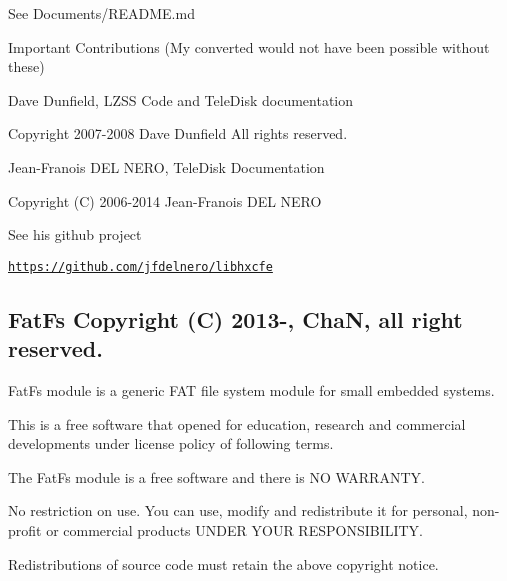\begin{DoxyItemize}
\item See Documents/\+R\+E\+A\+D\+M\+E.\+md
\begin{DoxyItemize}
\item Important Contributions (My converted would not have been possible without these)
\begin{DoxyItemize}
\item Dave Dunfield, L\+Z\+SS Code and Tele\+Disk documentation
\begin{DoxyItemize}
\item Copyright 2007-\/2008 Dave Dunfield All rights reserved.
\end{DoxyItemize}
\item Jean-\/\+Franois D\+EL N\+E\+RO, Tele\+Disk Documentation
\begin{DoxyItemize}
\item Copyright (C) 2006-\/2014 Jean-\/\+Franois D\+EL N\+E\+RO
\item See his github project
\begin{DoxyItemize}
\item \href{https://github.com/jfdelnero/libhxcfe}{\tt https\+://github.\+com/jfdelnero/libhxcfe} 


\end{DoxyItemize}
\end{DoxyItemize}
\end{DoxyItemize}
\end{DoxyItemize}
\end{DoxyItemize}

\subsection*{Fat\+Fs Copyright (C) 2013-\/, ChaN, all right reserved.}

Fat\+Fs module is a generic F\+AT file system module for small embedded systems.

This is a free software that opened for education, research and commercial developments under license policy of following terms.


\begin{DoxyItemize}
\item The Fat\+Fs module is a free software and there is NO W\+A\+R\+R\+A\+N\+TY.
\item No restriction on use. You can use, modify and redistribute it for personal, non-\/profit or commercial products U\+N\+D\+ER Y\+O\+UR R\+E\+S\+P\+O\+N\+S\+I\+B\+I\+L\+I\+TY.
\item Redistributions of source code must retain the above copyright notice.
\end{DoxyItemize}





